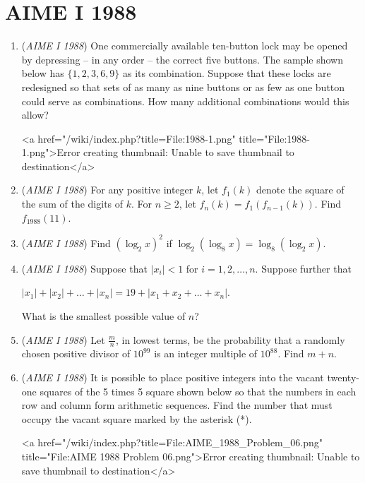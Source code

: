 \section{AIME I 1988}
        \begin{enumerate}
        	\item (\textit{AIME I 1988}) One commercially available ten-button lock may be opened by depressing -- in any order -- the correct five buttons. The sample shown below has $\{1, 2, 3, 6, 9\}$ as its combination. Suppose that these locks are redesigned so that sets of as many as nine buttons or as few as one button could serve as combinations. How many additional combinations would this allow?


 <a href="/wiki/index.php?title=File:1988-1.png" title="File:1988-1.png">Error creating thumbnail: Unable to save thumbnail to destination</a>


	\item (\textit{AIME I 1988}) For any positive integer $k$, let $f_1(k)$ denote the square of the sum of the digits of $k$.  For $n \ge 2$, let $f_n(k) = f_1(f_{n - 1}(k))$.  Find $f_{1988}(11)$.


 

	\item (\textit{AIME I 1988}) Find $(\log_2 x)^2$ if $\log_2 (\log_8 x) = \log_8 (\log_2 x)$.


 

	\item (\textit{AIME I 1988}) Suppose that $|x_i| < 1$ for $i = 1, 2, \dots, n$. Suppose further that


 $|x_1| + |x_2| + \dots + |x_n| = 19 + |x_1 + x_2 + \dots + x_n|$.

 What is the smallest possible value of $n$?


 

	\item (\textit{AIME I 1988}) Let $\frac{m}{n}$, in lowest terms, be the probability that a randomly chosen positive divisor of $10^{99}$ is an integer multiple of $10^{88}$. Find $m + n$.


 

	\item (\textit{AIME I 1988}) It is possible to place positive integers into the vacant twenty-one squares of the 5 times 5 square shown below so that the numbers in each row and column form arithmetic sequences. Find the number that must occupy the vacant square marked by the asterisk (*).


 <a href="/wiki/index.php?title=File:AIME\_1988\_Problem\_06.png" title="File:AIME 1988 Problem 06.png">Error creating thumbnail: Unable to save thumbnail to destination</a>



\end{enumerate}
